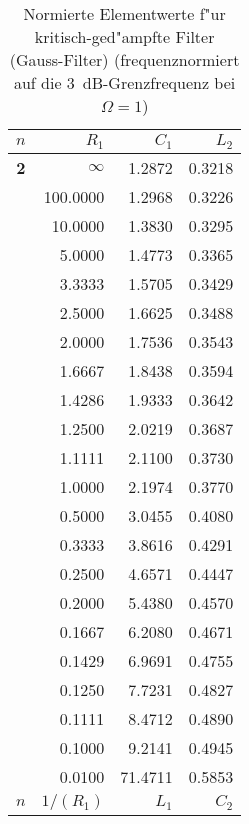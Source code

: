 \begin{table}[!htb]
\begin{center}
{\tiny
\begin{tabular}{|c||r|r|r| }\hline
$n$ & $R_1$   & $C_1$ & $L_2$ \\ \hline\hline



\textbf{ 2}&$\infty$&1.2872&0.3218\\
&100.0000&1.2968&0.3226\\
&10.0000&1.3830&0.3295\\
&5.0000&1.4773&0.3365\\
&3.3333&1.5705&0.3429\\
&2.5000&1.6625&0.3488\\
&2.0000&1.7536&0.3543\\
&1.6667&1.8438&0.3594\\
&1.4286&1.9333&0.3642\\
&1.2500&2.0219&0.3687\\
&1.1111&2.1100&0.3730\\
&1.0000&2.1974&0.3770\\
&0.5000&3.0455&0.4080\\
&0.3333&3.8616&0.4291\\
&0.2500&4.6571&0.4447\\
&0.2000&5.4380&0.4570\\
&0.1667&6.2080&0.4671\\
&0.1429&6.9691&0.4755\\
&0.1250&7.7231&0.4827\\
&0.1111&8.4712&0.4890\\
&0.1000&9.2141&0.4945\\
&0.0100&71.4711&0.5853\\ \hline



\hline\hline
$n$ & $1/(R_1)$ & $L_1$ & $C_2$ \\ \hline

\end{tabular}\vspace*{-1mm}\caption{Normierte Elementwerte
    f"ur kritisch-ged"ampfte Filter (Gauss-Filter) (frequenznormiert
    auf die 3~dB-Grenzfrequenz bei $\Omega=1$) }}
\end{center}
\vspace*{-6mm}
\end{table}%





